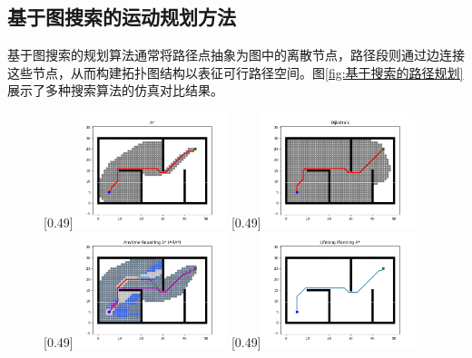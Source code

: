 \documentclass[master,academic]{ysuthesis} %
\begin{document}
	\newpage
	\vspace*{-1.5em}

		\subsection{基于图搜索的运动规划方法}
		基于图搜索的规划算法通常将路径点抽象为图中的离散节点，路径段则通过边连接这些节点，从而构建拓扑图结构以表征可行路径空间。图\ref{fig:基于搜索的路径规划}展示了多种搜索算法的仿真对比结果。
		\begin{figure}[H]
			\centering
			[0.49\textwidth]{\includegraphics[width=0.4\textwidth]{fig/插图/A-search/Astar.png}}
			[0.49\textwidth]{\includegraphics[width=0.4\textwidth]{fig/插图/A-search/Dijstra.png}}
			[0.49\textwidth]{\includegraphics[width=0.4\textwidth]{fig/插图/A-search/ARAstar.png}}
			[0.49\textwidth]{\includegraphics[width=0.4\textwidth]{fig/插图/A-search/LPAstar.png}}

\end{figure}
\end{document}
